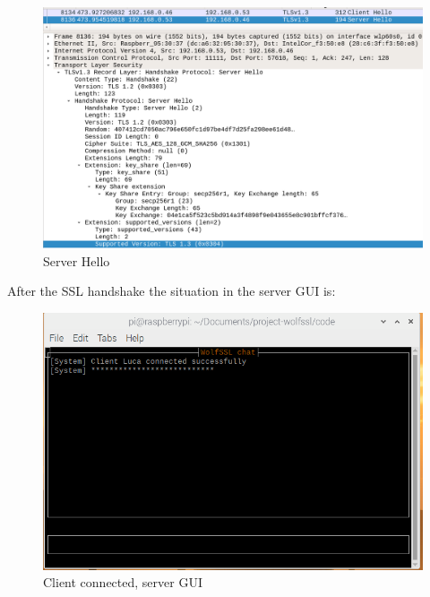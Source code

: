 \documentclass[a4paper,12pt]{article}
\begin{document}
\begin{figure}[H]
    \centering
    \includegraphics[scale=0.248]{./code/img/server-hello.png}
    \caption{Server Hello}
    
\end{figure}


After the SSL handshake the situation in the server GUI is:
\begin{figure}[H]
    \centering
    \includegraphics[scale=0.6]{./code/img/2-server.png}
    \caption{Client connected, server GUI}
    
\end{figure}
\end{document}
